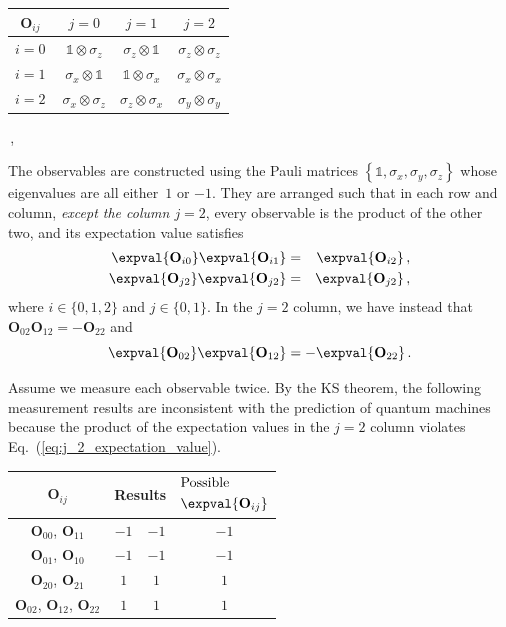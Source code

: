 \documentclass[english,reprint, aps, prl,superscriptaddress, showpacs,
showkeys, longbibliography, amsmath, amssymb, floatfix]{revtex4-1}
\theoremstyle{plain}
\theoremstyle{definition}
\begin{document}
{\renewcommand{\arraystretch}{2}%
\begin{center} 
\begin{tabular}{r|@{\quad}c@{\quad}|@{\quad}c@{\quad}|@{\quad}c@{\quad}|} 
$\mathbf{O}_{ij}$~ & $j=0$ & $j=1$ & $j=2$ \\ 
\hline  
$i=0~$ & $\mathbb{1}\otimes\sigma_{z}$  & $\sigma_{z}\otimes\mathbb{1}$  & $\sigma_{z}\otimes\sigma_{z}$ \tabularnewline 
\hline  
$i=1~$ & $\sigma_{x}\otimes\mathbb{1}$  & $\mathbb{1}\otimes\sigma_{x}$  & $\sigma_{x}\otimes\sigma_{x}$ \tabularnewline 
\hline  
$i=2~$ & $\sigma_{x}\otimes\sigma_{z}$  & $\sigma_{z}\otimes\sigma_{x}$  & $\sigma_{y}\otimes\sigma_{y}$ \tabularnewline 
\hline  
\end{tabular}\,,
\par\end{center} 
}

\noindent The observables are constructed using the Pauli matrices
$\left\{ \mathbb{1},\sigma_{x},\sigma_{y},\sigma_{z}\right\} $ whose
eigenvalues are all either~$1$ or $-1$. They are arranged such
that in each row and column, \emph{except the column $j=2$}, every
observable is the product of the other two, and its expectation value
satisfies 
\begin{eqnarray}
\expval{\mathbf{O}_{i0}}\expval{\mathbf{O}_{i1}} & = & \expval{\mathbf{O}_{i2}}\,,\label{eq:i_expectation_value}\\
\expval{\mathbf{O}_{j2}}\expval{\mathbf{O}_{j2}} & = & \expval{\mathbf{O}_{j2}}\,,\label{eq:j_0_1_expectation_value}
\end{eqnarray}
where $i\in\{0,1,2\}$ and $j\in\{0,1\}$. In the $j=2$ column, we
have instead that $\mathbf{O}_{02}\mathbf{O}_{12}=-\mathbf{O}_{22}$
and 
\begin{equation}
\expval{\mathbf{O}_{02}}\expval{\mathbf{O}_{12}}=-\expval{\mathbf{O}_{22}}\,.\label{eq:j_2_expectation_value}
\end{equation}

Assume we measure each observable twice. By the KS theorem, the following
measurement results are inconsistent with the prediction of quantum
machines because the product of the expectation values in the $j=2$
column violates Eq.~(\ref{eq:j_2_expectation_value}). 
\begin{center}
\begin{tabular}{cccc}
\toprule 
\addlinespace
$\mathbf{O}_{ij}$  & \multicolumn{2}{c}{Results} & $\begin{aligned} & \textrm{Possible}\\
 & \expval{\mathbf{O}_{ij}}
\end{aligned}
$\tabularnewline
\midrule
\midrule 
\addlinespace
$\mathbf{O}_{00}$, $\mathbf{O}_{11}$ & $-1$  & $-1$  & $-1$\tabularnewline
\midrule 
\addlinespace
$\mathbf{O}_{01}$, $\mathbf{O}_{10}$ & $-1$  & $-1$  & $-1$\tabularnewline
\midrule 
\addlinespace
$\mathbf{O}_{20}$, $\mathbf{O}_{21}$ & $1$  & $1$  & $1$\tabularnewline
\midrule 
\addlinespace
$\mathbf{O}_{02}$, $\mathbf{O}_{12}$, $\mathbf{O}_{22}$ & $1$  & $1$  & $1$\tabularnewline
\bottomrule
\end{tabular}
\par\end{center}
\end{document}
